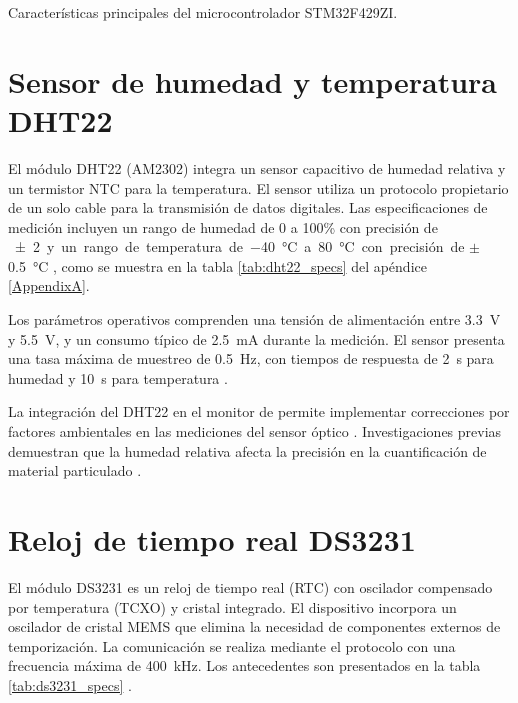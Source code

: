 \begin{table}[h!]
	\centering
	\caption{Características principales del microcontrolador STM32F429ZI.}
	\small
	
	\label{tab:micro_specs}
\end{table}





\section{Sensor de humedad y temperatura DHT22}

El módulo DHT22 (AM2302) integra un sensor capacitivo de humedad relativa y un termistor NTC para la temperatura. El sensor utiliza un protocolo propietario de un solo cable para la transmisión de datos digitales. Las especificaciones de medición incluyen un rango de humedad de 0 a 100\% con precisión de \SI{\pm2} y un rango de temperatura de \SI{-40}{\celsius} a \SI{80}{\celsius} con precisión de $\pm$\SI{0.5}{\celsius} \citep{Aosong2023}, como se muestra en la tabla \ref{tab:dht22_specs} del apéndice \ref{AppendixA}.

Los parámetros operativos comprenden una tensión de alimentación entre \SI{3.3}{\volt} y \SI{5.5}{\volt}, y un consumo típico de \SI{2.5}{\milli\ampere} durante la medición. El sensor presenta una tasa máxima de muestreo de \SI{0.5}{\hertz}, con tiempos de respuesta de \SI{2}{\second} para humedad y \SI{10}{\second} para temperatura \citep{SparkFun2023}.

La integración del DHT22 en el monitor de \MPF permite implementar correcciones por factores ambientales en las mediciones del sensor óptico \cite{Di2018}. Investigaciones previas demuestran que la humedad relativa afecta la precisión en la cuantificación de material particulado \citep{Kuula2020}.





\section{Reloj de tiempo real DS3231}

El módulo DS3231 es un reloj de tiempo real (RTC) con oscilador compensado por temperatura (TCXO) y cristal integrado. El dispositivo incorpora un oscilador de cristal MEMS que elimina la necesidad de componentes externos de temporización. La comunicación se realiza mediante el protocolo \IIC con una frecuencia máxima de \SI{400}{\kilo\hertz}. Los antecedentes son presentados en la tabla \ref{tab:ds3231_specs} \citep{Maxim2015}. 

